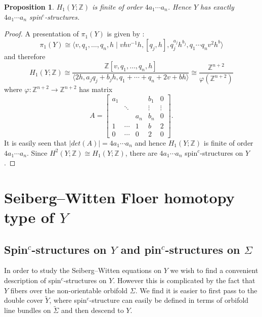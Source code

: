 \documentclass{amsart}
\newtheorem{proposition}[theorem]{Proposition}
\theoremstyle{definition}
\theoremstyle{remark}
\numberwithin{equation}{section}
\begin{document}
\begin{proposition}
$H_1(Y ; \mathbb{Z})$ is finite of order $4a_1 \cdots a_n$. Hence $Y$ has exactly $4a_1 \cdots a_n$ spin$^c$-structures.
\end{proposition}
\begin{proof}
A presentation of $\pi_1(Y)$ is given by \cite[]{or}:
\[
\pi_1(Y) \cong \langle v , q_1 , \dots , q_n , h \; | \; vhv^{-1}h, [q_j , h], q_j^{a_j} h^{b_j}, q_1 \cdots q_n v^2 h^b \rangle
\]
and therefore
\[
H_1(Y ; \mathbb{Z}) \cong \frac{\mathbb{Z}[ v , q_1 , \dots , q_n , h]}{\langle 2h , a_j q_j + b_j h , q_1 + \cdots + q_n + 2v + bh \rangle} \cong \frac{\mathbb{Z}^{n+2}}{\varphi (\mathbb{Z}^{n+2})}
\]
where $\varphi : \mathbb{Z}^{n+2} \to \mathbb{Z}^{n+2}$ has matrix
\[
A = \left[ \begin{matrix} a_1 & & & b_1 & 0 \\ & \ddots & & \vdots & \vdots \\ & & a_n & b_n & 0 \\ 1 & \cdots & 1 & b & 2 \\ 0 & \cdots & 0 & 2 & 0  \end{matrix} \right].
\]
It is easily seen that $|det(A)| = 4a_1 \cdots a_n$ and hence $H_1(Y ; \mathbb{Z})$ is finite of order $4a_1 \cdots a_n$. Since $H^2(Y ; \mathbb{Z}) \cong H_1(Y ; \mathbb{Z})$, there are $4a_1 \cdots a_n$ spin$^c$-structures on $Y$.

\end{proof}

\section{Seiberg--Witten Floer homotopy type of $Y$}\label{sec:swfht}

\subsection{Spin$^c$-structures on $Y$ and pin$^c$-structures on $\Sigma$}\label{sec:spincY}

In order to study the Seiberg--Witten equations on $Y$ we wish to find a convenient description of spin$^c$-structures on $Y$. However this is complicated by the fact that $Y$ fibers over the non-orientable orbifold $\Sigma$. We find it is easier to first pass to the double cover $\widetilde{Y}$, where spin$^c$-structure can easily be defined in terms of orbifold line bundles on $\widetilde{\Sigma}$ and then descend to $Y$.
\end{document}
